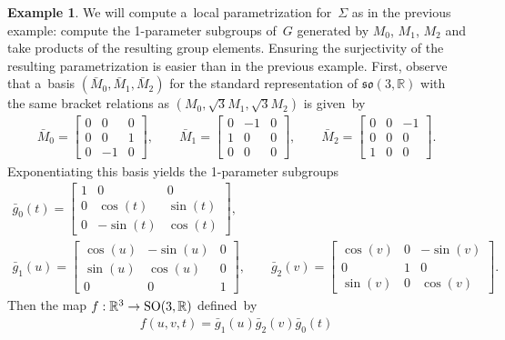 \documentclass[10pt,a4paper]{amsart}
\numberwithin{equation}{section}
\theoremstyle{definition}
\newtheorem{exmpl}[teo]{Example}
\begin{document}
\begin{exmpl}
We will compute a~local parametrization for~$\Sigma$ as in the previous example: compute the 1-parameter subgroups
of~$G$ generated by $M_0$, $M_1$, $M_2$ and take products of the resulting group elements.
Ensuring the surjectivity of the resulting parametrization is easier than in the previous example.
First, observe that a~basis $(\bar{M}_0, \bar{M}_1, \bar{M}_2)$ for the standard representation of
$\mathfrak{so}(3,\mathbb{R})$ with the same bracket relations as $(M_0, \sqrt{3}M_1, \sqrt{3}M_2)$ is given~by
\begin{gather*}
\bar{M}_0 =
\begin{bmatrix}
0 & 0 & 0
\\
0 & 0 & 1
\\
0 & -1 & 0
\end{bmatrix},
\qquad
\bar{M}_1 =
\begin{bmatrix}
0 & -1 & 0
\\
1 & 0 & 0
\\
0 & 0 & 0
\end{bmatrix},
\qquad
\bar{M}_2 =
\begin{bmatrix}
0 & 0 & -1
\\
0 & 0 & 0
\\
1 & 0 & 0
\end{bmatrix}.
\end{gather*}
Exponentiating this basis yields the 1-parameter subgroups
\begin{gather*}
\bar{g}_0(t) =
\begin{bmatrix}
1 & 0 & 0
\\
0 & \cos(t) & \sin(t)
\\
0 & -\sin(t) & \cos(t)
\end{bmatrix},
\\
\bar{g}_1(u) =
\begin{bmatrix}
\cos (u) & -\sin (u) & 0
\\
\sin (u) & \cos (u) & 0
\\
0 & 0 & 1
\end{bmatrix},
\qquad
\bar{g}_2(v) =
\begin{bmatrix}
\cos (v) & 0 & -\sin (v)
\\
0 & 1 & 0
\\
\sin (v) & 0 & \cos (v)
\end{bmatrix}.
\end{gather*}
Then the map $f: \mathbb{R}^3 \to {\rm SO}(3,\mathbb{R})$ def\/ined~by
\begin{gather*}
f(u,v,t) = \bar{g}_1(u) \bar{g}_2(v) \bar{g}_0(t)
\\

\end{gather*}
\end{exmpl}
\end{document}

